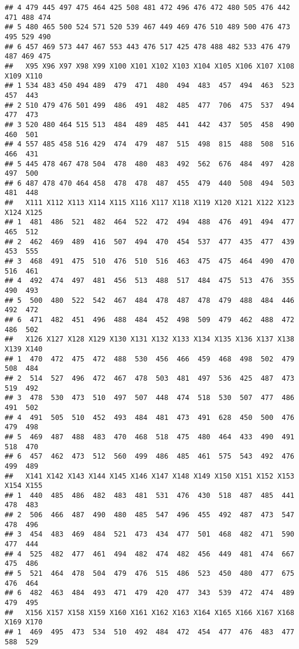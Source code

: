 \documentclass[
]{article}
\begin{document}
\begin{verbatim}
## 4 479 445 497 475 464 425 508 481 472 496 476 472 480 505 476 442 471 488 474
## 5 480 465 500 524 571 520 539 467 449 469 476 510 489 500 476 473 495 529 490
## 6 457 469 573 447 467 553 443 476 517 425 478 488 482 533 476 479 487 469 475
##   X95 X96 X97 X98 X99 X100 X101 X102 X103 X104 X105 X106 X107 X108 X109 X110
## 1 534 483 450 494 489  479  471  480  494  483  457  494  463  523  457  443
## 2 510 479 476 501 499  486  491  482  485  477  706  475  537  494  477  473
## 3 520 480 464 515 513  484  489  485  441  442  437  505  458  490  460  501
## 4 557 485 458 516 429  474  479  487  515  498  815  488  508  516  466  431
## 5 445 478 467 478 504  478  480  483  492  562  676  484  497  428  497  500
## 6 487 478 470 464 458  478  478  487  455  479  440  508  494  503  481  448
##   X111 X112 X113 X114 X115 X116 X117 X118 X119 X120 X121 X122 X123 X124 X125
## 1  481  486  521  482  464  522  472  494  488  476  491  494  477  465  512
## 2  462  469  489  416  507  494  470  454  537  477  435  477  439  453  555
## 3  468  491  475  510  476  510  516  463  475  475  464  490  470  516  461
## 4  492  474  497  481  456  513  488  517  484  475  513  476  355  490  493
## 5  500  480  522  542  467  484  478  487  478  479  488  484  446  492  472
## 6  471  482  451  496  488  484  452  498  509  479  462  488  472  486  502
##   X126 X127 X128 X129 X130 X131 X132 X133 X134 X135 X136 X137 X138 X139 X140
## 1  470  472  475  472  488  530  456  466  459  468  498  502  479  508  484
## 2  514  527  496  472  467  478  503  481  497  536  425  487  473  519  492
## 3  478  530  473  510  497  507  448  474  518  530  507  477  486  491  502
## 4  491  505  510  452  493  484  481  473  491  628  450  500  476  479  498
## 5  469  487  488  483  470  468  518  475  480  464  433  490  491  518  470
## 6  457  462  473  512  560  499  486  485  461  575  543  492  476  499  489
##   X141 X142 X143 X144 X145 X146 X147 X148 X149 X150 X151 X152 X153 X154 X155
## 1  440  485  486  482  483  481  531  476  430  518  487  485  441  478  483
## 2  506  466  487  490  480  485  547  496  455  492  487  473  547  478  496
## 3  454  483  469  484  521  473  434  477  501  468  482  471  590  477  444
## 4  525  482  477  461  494  482  474  482  456  449  481  474  667  475  486
## 5  521  464  478  504  479  476  515  486  523  450  480  477  675  476  464
## 6  482  463  484  493  471  479  420  477  343  539  472  474  489  479  495
##   X156 X157 X158 X159 X160 X161 X162 X163 X164 X165 X166 X167 X168 X169 X170
## 1  469  495  473  534  510  492  484  472  454  477  476  483  477  588  529

\end{verbatim}
\end{document}
